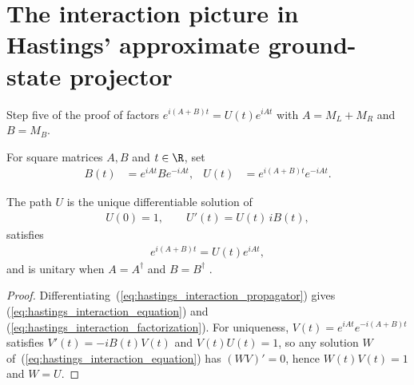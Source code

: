 \section{The interaction picture in Hastings' approximate ground-state projector}
\label{sec:hastings_interaction_picture}


Step five of the proof of \cite[Lemma~1]{Hastings2007AreaLaw} factors
$e^{i(A+B)t}=U(t)e^{iAt}$ with $A=M_L+M_R$ and $B=M_B$.

\begin{definition}
    \label{def:hastings_interaction_propagator}
    \leanok
    For square matrices $A,B$ and $t\in\R$, set
    \begin{align}
        B(t) & =e^{iAt}Be^{-iAt}, & U(t) & =e^{i(A+B)t}e^{-iAt}.
        \label{eq:hastings_interaction_propagator}
    \end{align}
\end{definition}

\begin{lemma}
    \label{thm:hastings_interaction_picture}
    \leanok
    The path $U$ is the unique differentiable solution of
    \begin{align}
        U(0)=1,\qquad U'(t)=U(t)\,iB(t),
        \label{eq:hastings_interaction_equation}
    \end{align}
    satisfies
    \begin{align}
        e^{i(A+B)t}=U(t)e^{iAt},
        \label{eq:hastings_interaction_factorization}
    \end{align}
    and is unitary when $A=A^\dagger$ and $B=B^\dagger$
    \cite[lines 853--864]{Hastings2007AreaLaw}.
\end{lemma}
\begin{proof}\leanok
    Differentiating~(\ref{eq:hastings_interaction_propagator}) gives
    (\ref{eq:hastings_interaction_equation}) and
    (\ref{eq:hastings_interaction_factorization}). For uniqueness,
    $V(t)=e^{iAt}e^{-i(A+B)t}$ satisfies $V'(t)=-iB(t)V(t)$ and $V(t)U(t)=1$,
    so any solution $W$ of~(\ref{eq:hastings_interaction_equation}) has
    $(WV)'=0$, hence $W(t)V(t)=1$ and $W=U$.
\end{proof}

